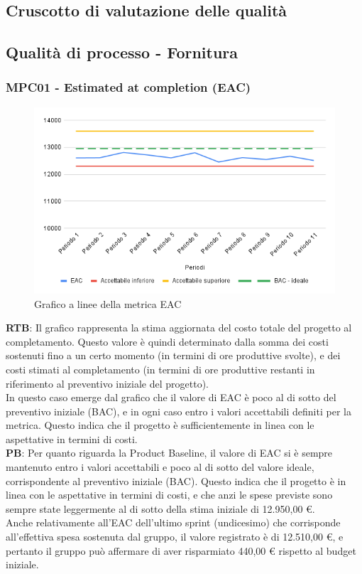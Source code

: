 \documentclass[10pt]{article}
\begin{document}
\begin{justify}
\section{Cruscotto di valutazione delle qualità}
\label{sec:cruscotto}
\subsection{Qualità di processo - Fornitura}
\label{sec:QdP_fornitura}
\subsubsection{MPC01 - Estimated at completion (EAC)}

\begin{figure}[H]
  \centering
  \includegraphics[width=0.9\linewidth]{EAC.png}
  \caption{Grafico a linee della metrica EAC}
  \label{fig:EACchart}
\end{figure}


\textbf{RTB}: Il grafico rappresenta la stima aggiornata del costo totale del progetto al completamento. Questo valore è quindi determinato dalla somma 
dei costi sostenuti fino a un certo momento (in termini di ore produttive svolte), e dei costi stimati al completamento (in termini di ore produttive 
restanti in riferimento al preventivo iniziale del progetto).\\ 
In questo caso emerge dal grafico che il valore di EAC è poco al di sotto del preventivo iniziale (BAC), e in ogni caso entro i valori accettabili definiti
per la metrica. Questo indica che il progetto è sufficientemente in linea con le aspettative in termini di costi.\\

\noindent
\textbf{PB}: Per quanto riguarda la Product Baseline, il valore di EAC si è sempre mantenuto entro i valori accettabili e poco al di sotto del valore ideale,
corrispondente al preventivo iniziale (BAC). Questo indica che il progetto è in linea con le aspettative in termini di costi, e che anzi le spese previste sono sempre
state leggermente al di sotto della stima iniziale di 12.950,00 €.\\
Anche relativamente all'EAC dell'ultimo sprint (undicesimo) che corrisponde all'effettiva spesa sostenuta dal gruppo, il valore registrato è di 12.510,00 €, e pertanto
il gruppo può affermare di aver risparmiato 440,00 € rispetto al budget iniziale.\\



\end{justify}
\end{document}
